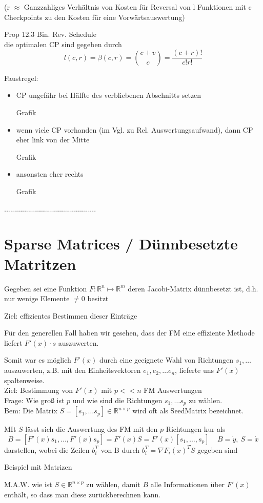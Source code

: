 (r $\approx$ Ganzzahliges Verhältnis von Kosten für Reversal von l Funktionen mit c Checkpoints zu den Kosten für eine Vorwärtsauswertung)

Prop 12.3 \glqq Bin. Rev. Schedule \grqq\\
die optimalen CP sind gegeben durch 
$$ l(c,r) = \beta(c,r) = \binom{c+v}{c} = \frac{(c+r)!}{c!r!}$$

Faustregel:
\begin{itemize}
	
	\item CP ungefähr bei Hälfte des verbliebenen Abschnitts setzen

	Grafik
	\item wenn viele CP vorhanden (im Vgl. zu Rel. Auswertungsaufwand), dann CP eher link von der Mitte
	
	Grafik
	\item ansonsten eher rechts
	
	Grafik
\end{itemize}


..............................................

\section{Sparse Matrices / Dünnbesetzte Matritzen}
\label{"chap:sparsemats"}

Gegeben sei eine Funktion $F:\mathbb{R}^n\mapsto\mathbb{R}^m$ deren Jacobi-Matrix dünnbesetzt ist, d.h. nur wenige Elemente $\neq 0 $ besitzt


Ziel: effizientes Bestimmen dieser Einträge

Für den generellen Fall haben wir gesehen, dass der FM eine effiziente Methode liefert $F'(x)\cdot s$ auszuwerten.

Somit war es möglich $F'(x)$ durch eine geeignete Wahl von Richtungen  $s_1,\dots$ auszuwerten, z.B. mit den Einheitsvektoren $e_1,e_2, \dots e_n$, lieferte uns $F'(x)$ spaltenweise.\\



\noindent
Ziel: Bestimmung von $F'(x)$ mit $p <<n$ FM Auswertungen\\
Frage: Wie groß ist $p$ und wie sind die Richtungen $s_1,\dots s_p$ zu wählen.\\
Bem: Die Matrix $S = [s_1, \dots s_p] \in \mathbb{R}^{n\times p}$ wird oft als \glqq Seed\grqq Matrix bezeichnet.

MIt $S$ lässt sich die Auswertung des FM mit den $p$ Richtungen kur als 
$$B = [ F'(x)s_1 , \dots , F'(x)s_p] = F'(x) S = F'(x) [s_1,\dots,s_p]\ \ \ \ \  B= \dot{y},\ S=\dot{x}$$
darstellen, wobei die Zeilen $b_i^T$ von B durch $b_i^T = \nabla F_i(x)^TS$ gegeben sind

Beispiel mit Matrizen

M.A.W. wie ist $S\in\mathbb{R}^{n\times p}$ zu wählen, damit $B$ alle Informationen über $F'(x)$ enthält, so dass man diese zurückberechnen kann.




%



